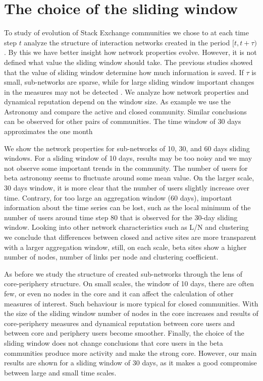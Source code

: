 \chapter{The choice of the sliding window} %

To study of evolution of Stack Exchange communities we chose to at each time step $t$ analyze the structure of interaction networks created in the period $[t, t+\tau)$. By this we have better insight how network properties evolve. However, it is not defined what value the sliding window should take. The previous studies showed that the value of sliding window determine how much information is saved. If $\tau$ is small, sub-networks are sparse, while for large sliding window important changes in the measures may not be detected \cite{krings2012effects, arnold2021moving}. We analyze how network properties and dynamical reputation depend on the window size. As example we use the Astronomy and compare the active and closed community. Similar conclusions can be observed for other pairs of communities.  The time window of 30 days approximates the one month  

We show the network properties for sub-networks of 10, 30, and 60 days sliding windows. For a sliding window of 10 days, results may be too noisy and we may not observe some important trends in the community. The number of users for beta astronomy seems to fluctuate around some mean value. On the larger scale, 30 days window,  it is more clear that the number of users slightly increase over time. Contrary, for too large an aggregation window (60 days), important information about the time series can be lost, such as the local minimum of the number of users around time step 80 that is observed for the 30-day sliding window. Looking into other network characteristics such as L/N and clustering we conclude that differences between closed and  active sites are more transparent with a larger aggregation window, still, on each scale, beta sites show a higher number of nodes, number of links per node and clustering coefficient.

As before we study the structure of created sub-networks through the lens of core-periphery structure. On small scales, the window of 10 days, there are often few, or even no nodes in the core and it can affect the calculation of other measures of interest. Such behaviour is more typical for closed communities.  With the size of the sliding window number of nodes in the core increases and results of core-periphery measures and dynamical reputation between core users and between core and periphery users become smoother. Finally, the choice of the sliding window does not change conclusions that core users in the beta communities produce more activity and make the strong core. However, our main results are shown for a sliding window of 30 days, as it makes a good compromise between large and small time scales.  

